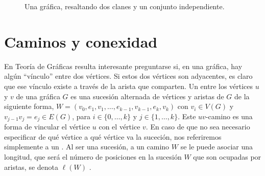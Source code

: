 \begin{figure}[ht!]
    \centering
    \caption{Una gr\'afica, resaltando dos clanes y un conjunto independiente.}
    \label{fig:ClanInd}
\end{figure}


\section{Caminos y conexidad}
\label{sec:CamConex}


En Teor\'ia de Gr\'aficas resulta interesante preguntarse si, en una
gr\'afica, hay alg\'un ``v\'inculo'' entre dos v\'ertices. Si estos dos
v\'ertices son adyacentes, es claro que ese v\'inculo existe a trav\'es de
la arista que comparten. Un  entre los v\'ertices $u$ y
$v$ de una gr\'afica $G$ es una sucesi\'on alternada de v\'ertices y aristas
de $G$ de la siguiente forma, $W=(v_0, e_1,v_1, \dots, e_{k-1},v_{k-1},
e_k,v_k)$ con $v_i \in V(G)$ y $v_{j-1}v_j = e_j \in E(G)$, para $i \in \{0,
\dots, k\}$ y $j \in \{ 1, \dots, k\}$. Este $uv$-camino es una forma de
vincular el v\'ertice $u$ con el v\'ertice $v$. En caso de que no sea
necesario especificar de qu\'e v\'ertice a qu\'e v\'ertice va la suceci\'on,
nos referiremos simplemente a un . Al ser una sucesi\'on, a
un camino $W$ se le puede asociar una longitud, que ser\'a el n\'umero de
posiciones en la sucesi\'on $W$ que son ocupadas por aristas, se denota
$\ell(W)$ . 

